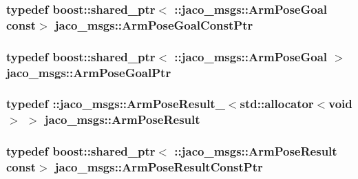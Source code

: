 \subsubsection[{\texorpdfstring{Arm\+Pose\+Goal\+Const\+Ptr}{ArmPoseGoalConstPtr}}]{\setlength{\rightskip}{0pt plus 5cm}typedef boost\+::shared\+\_\+ptr$<$ \+::{\bf jaco\+\_\+msgs\+::\+Arm\+Pose\+Goal} const$>$ {\bf jaco\+\_\+msgs\+::\+Arm\+Pose\+Goal\+Const\+Ptr}}\hypertarget{namespacejaco__msgs_ab8464776109924758c47fab6ce179567}{}\label{namespacejaco__msgs_ab8464776109924758c47fab6ce179567}
\subsubsection[{\texorpdfstring{Arm\+Pose\+Goal\+Ptr}{ArmPoseGoalPtr}}]{\setlength{\rightskip}{0pt plus 5cm}typedef boost\+::shared\+\_\+ptr$<$ \+::{\bf jaco\+\_\+msgs\+::\+Arm\+Pose\+Goal} $>$ {\bf jaco\+\_\+msgs\+::\+Arm\+Pose\+Goal\+Ptr}}\hypertarget{namespacejaco__msgs_aa7e27fa1c080cb8bb2bda37ce26d64fa}{}\label{namespacejaco__msgs_aa7e27fa1c080cb8bb2bda37ce26d64fa}
\subsubsection[{\texorpdfstring{Arm\+Pose\+Result}{ArmPoseResult}}]{\setlength{\rightskip}{0pt plus 5cm}typedef \+::{\bf jaco\+\_\+msgs\+::\+Arm\+Pose\+Result\+\_\+}$<$std\+::allocator$<$void$>$ $>$ {\bf jaco\+\_\+msgs\+::\+Arm\+Pose\+Result}}\hypertarget{namespacejaco__msgs_a75b02cbf5c3780ca0f73e5dc1b860dd3}{}\label{namespacejaco__msgs_a75b02cbf5c3780ca0f73e5dc1b860dd3}
\subsubsection[{\texorpdfstring{Arm\+Pose\+Result\+Const\+Ptr}{ArmPoseResultConstPtr}}]{\setlength{\rightskip}{0pt plus 5cm}typedef boost\+::shared\+\_\+ptr$<$ \+::{\bf jaco\+\_\+msgs\+::\+Arm\+Pose\+Result} const$>$ {\bf jaco\+\_\+msgs\+::\+Arm\+Pose\+Result\+Const\+Ptr}}\hypertarget{namespacejaco__msgs_a435993a8f07ca92191026509e5f4cd42}{}\label{namespacejaco__msgs_a435993a8f07ca92191026509e5f4cd42}
